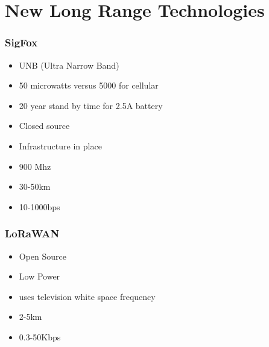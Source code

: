\documentclass{beamer}
\begin{document}
 \section{New Long Range Technologies}
  \begin{frame}
  	\frametitle{SigFox}
  	\begin{itemize}
  	\item UNB (Ultra Narrow Band)
  	\item 50 microwatts versus 5000  for cellular
  	\item 20 year stand by time for 2.5A battery
  	\item Closed source
  	\item Infrastructure in place
  	\item 900 Mhz
  	\item 30-50km
  	\item 10-1000bps
  	\end{itemize}
  \end{frame}
  \begin{frame}
  	\frametitle{LoRaWAN}
  	\begin{itemize}
  	\item Open Source
  	\item Low Power
  	\item uses television white space frequency
  	\item 2-5km
  	\item 0.3-50Kbps
  	\end{itemize}
  \end{frame}  
  
\end{document}
